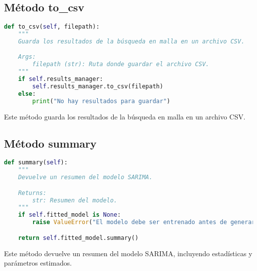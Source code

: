 \documentclass[12pt,letterpaper]{report}
\begin{document}
\subsection{Método to\_csv}
\begin{lstlisting}[language=python]
def to_csv(self, filepath):
    """
    Guarda los resultados de la búsqueda en malla en un archivo CSV.

    Args:
        filepath (str): Ruta donde guardar el archivo CSV.
    """
    if self.results_manager:
        self.results_manager.to_csv(filepath)
    else:
        print("No hay resultados para guardar")
\end{lstlisting}

Este método guarda los resultados de la búsqueda en malla en un archivo CSV.

\subsection{Método summary}
\begin{lstlisting}[language=python]
def summary(self):
    """
    Devuelve un resumen del modelo SARIMA.

    Returns:
        str: Resumen del modelo.
    """
    if self.fitted_model is None:
        raise ValueError("El modelo debe ser entrenado antes de generar el resumen")

    return self.fitted_model.summary()
\end{lstlisting}

Este método devuelve un resumen del modelo SARIMA, incluyendo estadísticas y parámetros estimados.
\end{document}
